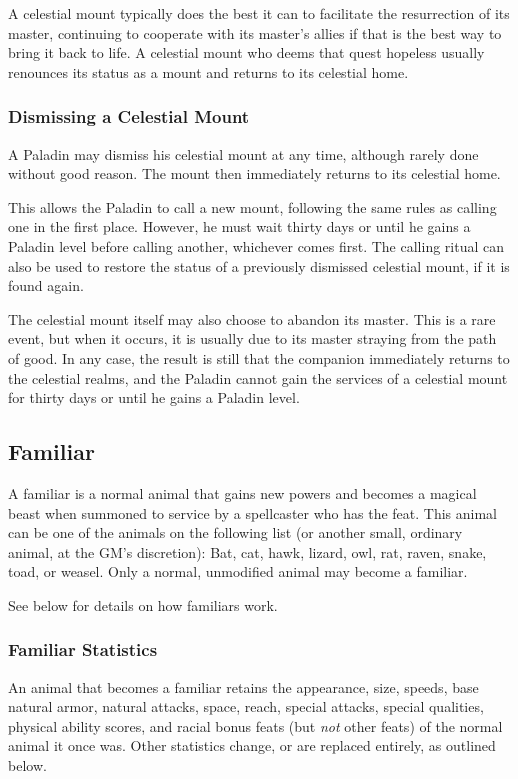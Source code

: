 A celestial mount typically does the best it can to facilitate the resurrection of its master, 
continuing to cooperate with its master's allies if that is the best way to bring it back to life.
A celestial mount who deems that quest hopeless usually renounces its status as a mount and returns to its celestial home.
\subsubsection{Dismissing a Celestial Mount}
A Paladin may dismiss his celestial mount at any time, although rarely done without good reason. 
The mount then immediately returns to its celestial home.

This allows the Paladin to call a new mount, following the same rules as calling one in the first place.
However, he must wait thirty days or until he gains a Paladin level before calling another, whichever comes first.
The calling ritual can also be used to restore the status of a previously dismissed celestial mount, if it is found again.

The celestial mount itself may also choose to abandon its master.
This is a rare event, but when it occurs, it is usually due to its master straying from the path of good.
In any case, the result is still that the companion immediately returns to the celestial realms, 
and the Paladin cannot gain the services of a celestial mount for thirty days or until he gains a Paladin level.
\subsection{Familiar}
\label{sec:Familiar}
A familiar is a normal animal that gains new powers and becomes a magical beast when summoned to service by a spellcaster
who has the  feat. 
This animal can be one of the animals on the following list (or another small, ordinary animal, at the GM's discretion):
Bat, cat, hawk, lizard, owl, rat, raven, snake, toad, or weasel.
Only a normal, unmodified animal may become a familiar.

See below for details on how familiars work.
\subsubsection{Familiar Statistics}
An animal that becomes a familiar retains the appearance, size, speeds, base natural armor, natural attacks, space, reach, special attacks, special qualities, physical ability scores, and racial bonus feats
(but \emph{not} other feats) of the normal animal it once was. Other statistics change, or are replaced entirely, as outlined below.

